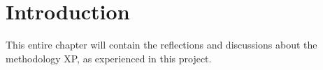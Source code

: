 \section{Introduction}
This entire chapter will contain the reflections and discussions about the methodology XP, as experienced in this project.